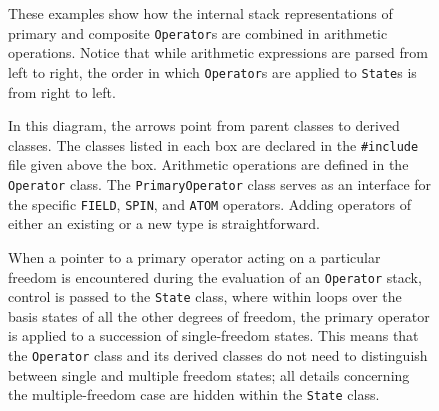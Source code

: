 \newpage

\begin{figure}   %
\caption{These examples show how the internal stack representations of primary
and composite {\tt Operator}s are combined in arithmetic operations.  Notice
that while arithmetic expressions are parsed from left to right, the order in
which {\tt Operator}s are applied to {\tt State}s is from right to left.}
\label{figstack}
\end{figure}

\begin{figure}   %
\caption{In this diagram, the arrows point from parent classes to derived
classes. The classes listed in each box are declared in the {\tt \#include} file
given above the box. Arithmetic operations are defined in the {\tt
Operator} class. The {\tt PrimaryOperator} class serves as an interface for the
specific {\tt FIELD}, {\tt SPIN}, and {\tt ATOM} operators. Adding operators of
either an existing or a new type is straightforward.}
\label{figinherit}
\end{figure}

\begin{figure}   %
\caption{When a pointer to a primary operator acting on a particular freedom is
encountered during the evaluation of an {\tt Operator} stack, control is passed
to the {\tt State} class, where within loops over the basis
states of all the other degrees of freedom, the primary operator is applied
to a succession of single-freedom
states. This means that the {\tt Operator} class and its derived classes do not
need to distinguish between single and multiple freedom states; all details
concerning the multiple-freedom case are hidden within the {\tt State} class.}
\label{figmultiple}
\end{figure}




